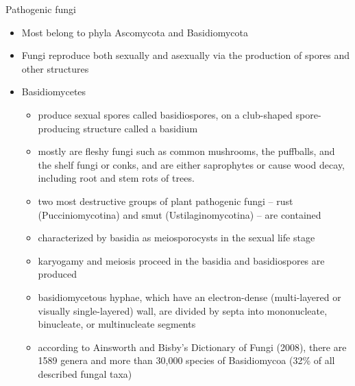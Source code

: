 \documentclass[10pt,dvipsnames,ignorenonframetext,aspectratio=169]{beamer}
\providecommand{\tightlist}{%
  \setlength{\itemsep}{0pt}\setlength{\parskip}{0pt}}
\begin{document}
\begin{frame}{Pathogenic fungi}
\protect\hypertarget{pathogenic-fungi}{}
\begin{itemize}
\tightlist
\item
  Most belong to phyla Ascomycota and Basidiomycota
\item
  Fungi reproduce both sexually and asexually via the production of
  spores and other structures
\item
  Basidiomycetes

  \begin{itemize}
  \tightlist
  \item
    produce sexual spores called basidiospores, on a club-shaped
    spore-producing structure called a basidium
  \item
    mostly are fleshy fungi such as common mushrooms, the puffballs, and
    the shelf fungi or conks, and are either saprophytes or cause wood
    decay, including root and stem rots of trees.
  \item
    two most destructive groups of plant pathogenic fungi -- rust
    (Pucciniomycotina) and smut (Ustilaginomycotina) -- are contained
  \item
    characterized by basidia as meiosporocysts in the sexual life stage
  \item
    karyogamy and meiosis proceed in the basidia and basidiospores are
    produced
  \item
    basidiomycetous hyphae, which have an electron-dense (multi-layered
    or visually single-layered) wall, are divided by septa into
    mononucleate, binucleate, or multinucleate segments
  \item
    according to Ainsworth and Bisby's Dictionary of Fungi (2008), there
    are 1589 genera and more than 30,000 species of Basidiomycoa (32\%
    of all described fungal taxa)
  \end{itemize}
\end{itemize}
\end{frame}
\end{document}
